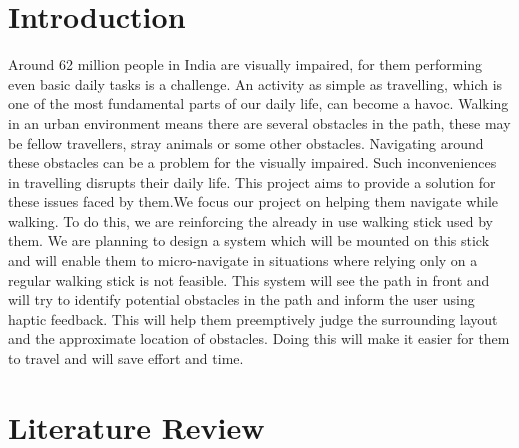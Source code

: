 \documentclass[conference]{IEEEtran}
\begin{document}
\section{Introduction}
Around 62 million people in India are visually impaired, for them performing even basic daily tasks is a challenge. An activity as simple as travelling, which is one of the most fundamental parts of our daily life, can become a havoc. Walking in an urban environment means there are several obstacles in the path, these may be fellow travellers, stray animals or some other obstacles. Navigating around these obstacles can be a problem for the visually impaired. Such inconveniences in travelling disrupts their daily life. This project aims to provide a solution for these issues faced by them.We focus our project on helping them navigate while walking. To do this, we are reinforcing the already in use walking stick used by them. We are planning to design a system which will be mounted on this stick and will enable them to micro-navigate in situations where relying only on a regular walking stick is not feasible. This system will see the path in front and will try to identify potential obstacles in the path and inform the user using haptic feedback. This will help them preemptively judge the surrounding layout and the approximate location of obstacles. Doing this will make it easier for them to travel and will save effort and time. 

\section{Literature Review}
\end{document}
